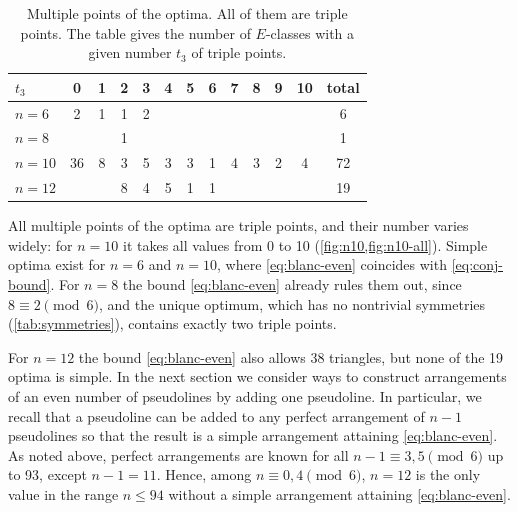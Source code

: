\begin{table}[H]
\centering
\small
\setlength{\tabcolsep}{4pt}
\caption{Multiple points of the optima. All of them are triple points. The table gives the number of $E$-classes with a given number $t_3$ of triple points.}
\label{tab:triple-points}
\begin{tabular}{lcccccccccccc}
\toprule
$t_3$ & 0 & 1 & 2 & 3 & 4 & 5 & 6 & 7 & 8 & 9 & 10 & total \\
\midrule
$n=6$ & 2 & 1 & 1 & 2 &  &  &  &  &  &  &  & 6 \\
$n=8$ &  &  & 1 &  &  &  &  &  &  &  &  & 1 \\
$n=10$ & 36 & 8 & 3 & 5 & 3 & 3 & 1 & 4 & 3 & 2 & 4 & 72 \\
$n=12$ &  &  & 8 & 4 & 5 & 1 & 1 &  &  &  &  & 19 \\
\bottomrule
\end{tabular}
\end{table}

All multiple points of the optima are triple points, and their number varies widely: for $n=10$ it takes all values from 0 to 10 (\cref{fig:n10,fig:n10-all}). Simple optima exist for $n=6$ and $n=10$, where \eqref{eq:blanc-even} coincides with \eqref{eq:conj-bound}. For $n=8$ the bound \eqref{eq:blanc-even} already rules them out, since $8\equiv 2\pmod 6$, and the unique optimum, which has no nontrivial symmetries (\cref{tab:symmetries}), contains exactly two triple points.

For $n=12$ the bound \eqref{eq:blanc-even} also allows 38 triangles, but none of the 19 optima is simple. In the next section we consider ways to construct arrangements of an even number of pseudolines by adding one pseudoline. In particular, we recall that a pseudoline can be added to any perfect arrangement of $n-1$ pseudolines so that the result is a simple arrangement attaining \eqref{eq:blanc-even}. As noted above, perfect arrangements are known for all $n-1\equiv3,5\pmod6$ up to 93, except $n-1=11$. Hence, among $n\equiv0,4\pmod6$, $n=12$ is the only value in the range $n\le94$ without a simple arrangement attaining \eqref{eq:blanc-even}.
